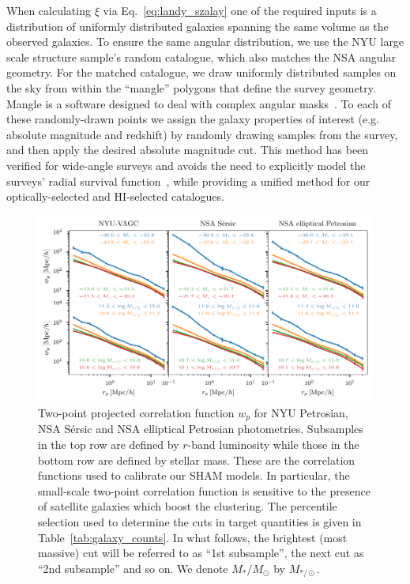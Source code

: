 \documentclass[usenatbib,useAMS]{mnras}
\newcommand{\HI}{\ensuremath{\mathrm{H}\scriptstyle\mathrm{I}}}
\begin{document}
When calculating $\xi$ via Eq.~\eqref{eq:landy_szalay} one of the required inputs is a distribution of uniformly distributed galaxies spanning the same volume as the observed galaxies. To ensure the same angular distribution, we use the \ac{NYU} large scale structure sample's random catalogue, which also matches the \ac{NSA} angular geometry. For the matched catalogue, we draw uniformly distributed samples on the sky from within the ``mangle'' polygons that define the survey geometry. Mangle is a software designed to deal with complex angular masks~\citep{Mangle}. To each of these randomly-drawn points we assign the galaxy properties of interest (e.g. absolute magnitude and redshift) by randomly drawing samples from the survey, and then apply the desired absolute magnitude cut. This method has been verified for wide-angle surveys and avoids the need to explicitly model the surveys' radial survival function~\citep{Ross_et_al}, while providing a unified method for our optically-selected and $\HI$-selected catalogues.

\begin{figure}
    \centering
    \includegraphics[width=1.0\textwidth]{Figures/optical_clustering.pdf}
    \caption{Two-point projected correlation function $w_p$ for \ac{NYU} Petrosian, \ac{NSA} S\'ersic and \ac{NSA} elliptical Petrosian photometries. Subsamples in the top row are defined by $r$-band luminosity while those in the bottom row are defined by stellar mass. These are the correlation functions used to calibrate our \ac{SHAM} models. In particular, the small-scale two-point correlation function is sensitive to the presence of satellite galaxies which boost the clustering. The percentile selection used to determine the cuts in target quantities is given in Table~\ref{tab:galaxy_counts}.
    In what follows, the brightest (most massive) cut will be referred to as ``1st subsample'', the next cut as ``2nd subsample'' and so on. We denote $M_* / M_\odot$ by $M_{*/\odot}$.}
    \label{fig:optical_clustering}
\end{figure}
\end{document}
